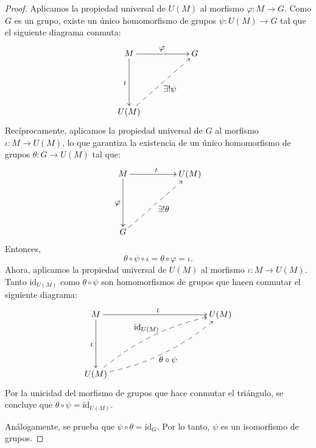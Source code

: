 \begin{proof}
	Aplicamos la propiedad universal de \( U(M) \) al morfismo \( \varphi : M \to G \). Como \( G \) es un grupo, existe un único homomorfismo de grupos \( \psi : U(M) \to G \) tal que el siguiente diagrama conmuta:
	\[
	\xymatrix{
		M \ar[rr]^{\displaystyle \varphi} \ar[dd]_{\displaystyle \iota} & & G \\
		&&\\
		U(M) \ar@{-->}[rruu]_{\displaystyle \exists! \psi} &&
	}
	\]
	Recíprocamente, aplicamos la propiedad universal de \( G \) al morfismo \( \iota : M \to U(M) \), lo que garantiza la existencia de un único homomorfismo de grupos \( \theta : G \to U(M) \) tal que:
	\[
	\xymatrix{
		M \ar[rr]^{\displaystyle \iota} \ar[dd]_{\displaystyle \varphi} & & U(M) \\
		&&\\
		G \ar@{-->}[rruu]_{\displaystyle \exists! \theta} &&
	}
	\] Entonces,
	\[
	\theta \circ \psi \circ \iota = \theta \circ \varphi = \iota.
	\] Ahora, aplicamos la propiedad universal de \( U(M) \) al morfismo \( \iota : M \to U(M) \). Tanto \( \mathrm{id}_{U(M)} \) como \( \theta \circ \psi \) son homomorfismos de grupos que hacen conmutar el siguiente diagrama:
	\[
	\xymatrix{
		M \ar[rrrr]^{\displaystyle \iota} \ar[dd]_{\displaystyle \iota} & &&& U(M) \\
		&&&&\\
		U(M) \ar@{-->}@/^1pc/[rrrruu]^{\displaystyle \mathrm{id}_{U(M)}} \ar@{-->}@/_1pc/[rrrruu]_{\displaystyle \theta \circ \psi} &&&&
	}
	\]
	Por la unicidad del morfismo de grupos que hace conmutar el triángulo, se concluye que \( \theta \circ \psi = \mathrm{id}_{U(M)} \).
	
	\medskip
	
	\noindent Análogamente, se prueba que \( \psi \circ \theta = \mathrm{id}_G \). Por lo tanto, \( \psi \) es un isomorfismo de grupos.
\end{proof}

